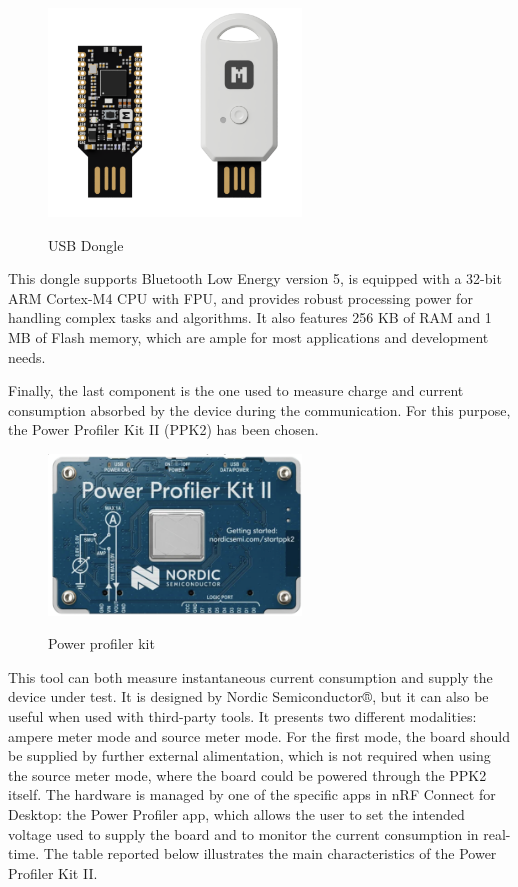 \documentclass{Configuration_Files/PoliMi3i_thesis}
\begin{document}
\begin{figure}[H]
    \centering
    \includegraphics[width=0.6\textwidth]{Materials/figure3}
    \label{materials_3}
    \caption{USB Dongle}
\end{figure}

This dongle supports Bluetooth Low Energy version 5, is equipped with a 32-bit ARM Cortex-M4 CPU with FPU, and provides robust processing power for handling complex tasks and algorithms. It also features 256 KB of RAM and 1 MB of Flash memory, which are ample for most applications and development needs.

Finally, the last component is the one used to measure charge and current consumption absorbed by the device during the communication. For this purpose, the Power Profiler Kit II (PPK2) has been chosen.

\begin{figure}[H]
    \centering
    \includegraphics[width=0.6\textwidth]{Materials/figure4}
    \label{materials_4}
    \caption{Power profiler kit}
\end{figure}

This tool can both measure instantaneous current consumption and supply the device under test. It is designed by Nordic Semiconductor®, but it can also be useful when used with third-party tools. It presents two different modalities: ampere meter mode and source meter mode. For the first mode, the board should be supplied by further external alimentation, which is not required when using the source meter mode, where the board could be powered through the PPK2 itself. The hardware is managed by one of the specific apps in nRF Connect for Desktop: the Power Profiler app, which allows the user to set the intended voltage used to supply the board and to monitor the current consumption in real-time. The table reported below illustrates the main characteristics of the Power Profiler Kit II.
\end{document}
